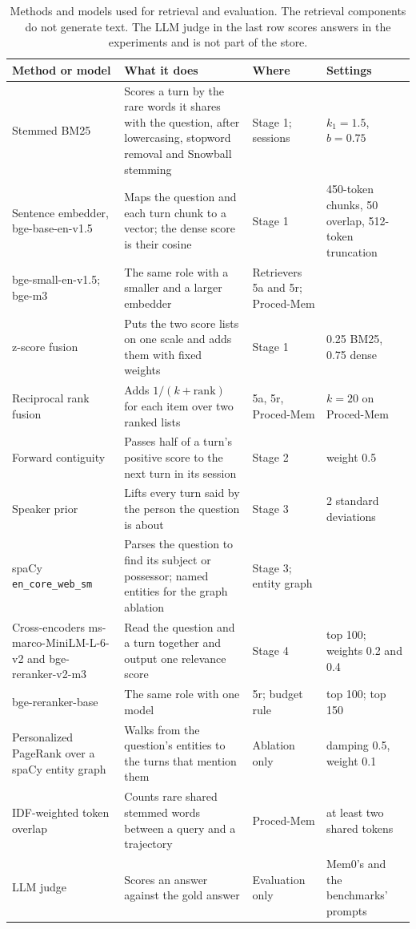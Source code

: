 \begin{table}[p]
\caption{Methods and models used for retrieval and evaluation. The retrieval components do not generate text. The LLM judge in the last row scores answers in the experiments and is not part of the store.}
\label{tab:methods}
\scriptsize
\centering
\setlength{\tabcolsep}{4pt}
\begin{tabular}{@{}L{38mm}L{60mm}L{30mm}L{26mm}@{}}
\toprule
Method or model & What it does & Where & Settings \\
\midrule
Stemmed BM25 \citep{robertson2009bm25,lu2024bm25s} & Scores a turn by the rare words it shares with the question, after lowercasing, stopword removal and Snowball stemming & Stage 1; \lmes{} sessions & $k_1 = 1.5$, $b = 0.75$ \\
Sentence embedder, bge-base-en-v1.5 \citep{xiao2023cpack} & Maps the question and each turn chunk to a vector; the dense score is their cosine & Stage 1 & 450-token chunks, 50 overlap, 512-token truncation \\
bge-small-en-v1.5; bge-m3 \citep{chen2024bgem3} & The same role with a smaller and a larger embedder & Retrievers 5a and 5r; Proced-Mem & \\
z-score fusion & Puts the two score lists on one scale and adds them with fixed weights & Stage 1 & 0.25 BM25, 0.75 dense \\
Reciprocal rank fusion \citep{cormack2009rrf} & Adds $1/(k + \mathrm{rank})$ for each item over two ranked lists & 5a, 5r, Proced-Mem & $k = 20$ on Proced-Mem \\
Forward contiguity & Passes half of a turn's positive score to the next turn in its session & Stage 2 & weight 0.5 \\
Speaker prior & Lifts every turn said by the person the question is about & Stage 3 & 2 standard deviations \\
spaCy \texttt{en\_core\_web\_sm} \citep{honnibal2020spacy} & Parses the question to find its subject or possessor; named entities for the graph ablation & Stage 3; entity graph & \\
Cross-encoders ms-marco-MiniLM-L-6-v2 and bge-reranker-v2-m3 \citep{wang2020minilm,chen2024bgem3} & Read the question and a turn together and output one relevance score & Stage 4 & top 100; weights 0.2 and 0.4 \\
bge-reranker-base & The same role with one model & 5r; \lmes{} budget rule & top 100; top 150 \\
Personalized PageRank over a spaCy entity graph \citep{haveliwala2002topic} & Walks from the question's entities to the turns that mention them & Ablation only & damping 0.5, weight 0.1 \\
IDF-weighted token overlap & Counts rare shared stemmed words between a query and a trajectory & Proced-Mem & at least two shared tokens \\
LLM judge & Scores an answer against the gold answer & Evaluation only & Mem0's and the benchmarks' prompts \\
\bottomrule
\end{tabular}
\end{table}

